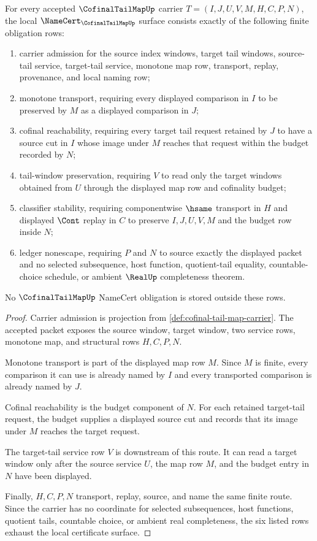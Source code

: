 \begin{theorem}
\label{thm:cofinal-tail-map-namecert-obligations}
For every accepted $\CofinalTailMapUp$ carrier $T=(I,J,U,V,M,H,C,P,N)$, the local $\NameCert_{\CofinalTailMapUp}$ surface consists exactly of the following finite obligation rows:
\begin{enumerate}
\item carrier admission for the source index windows, target tail windows, source-tail service, target-tail service, monotone map row, transport, replay, provenance, and local naming row;
\item monotone transport, requiring every displayed comparison in $I$ to be preserved by $M$ as a displayed comparison in $J$;
\item cofinal reachability, requiring every target tail request retained by $J$ to have a source cut in $I$ whose image under $M$ reaches that request within the budget recorded by $N$;
\item tail-window preservation, requiring $V$ to read only the target windows obtained from $U$ through the displayed map row and cofinality budget;
\item classifier stability, requiring componentwise $\hsame$ transport in $H$ and displayed $\Cont$ replay in $C$ to preserve $I,J,U,V,M$ and the budget row inside $N$;
\item ledger nonescape, requiring $P$ and $N$ to source exactly the displayed packet and no selected subsequence, host function, quotient-tail equality, countable-choice schedule, or ambient $\RealUp$ completeness theorem.
\end{enumerate}
No $\CofinalTailMapUp$ NameCert obligation is stored outside these rows.
\end{theorem}

\begin{proof}
Carrier admission is projection from \autoref{def:cofinal-tail-map-carrier}. The accepted packet exposes the source window, target window, two service rows, monotone map, and structural rows $H,C,P,N$.

Monotone transport is part of the displayed map row $M$. Since $M$ is finite, every comparison it can use is already named by $I$ and every transported comparison is already named by $J$.

Cofinal reachability is the budget component of $N$. For each retained target-tail request, the budget supplies a displayed source cut and records that its image under $M$ reaches the target request.

The target-tail service row $V$ is downstream of this route. It can read a target window only after the source service $U$, the map row $M$, and the budget entry in $N$ have been displayed.

Finally, $H,C,P,N$ transport, replay, source, and name the same finite route. Since the carrier has no coordinate for selected subsequences, host functions, quotient tails, countable choice, or ambient real completeness, the six listed rows exhaust the local certificate surface.
\end{proof}

